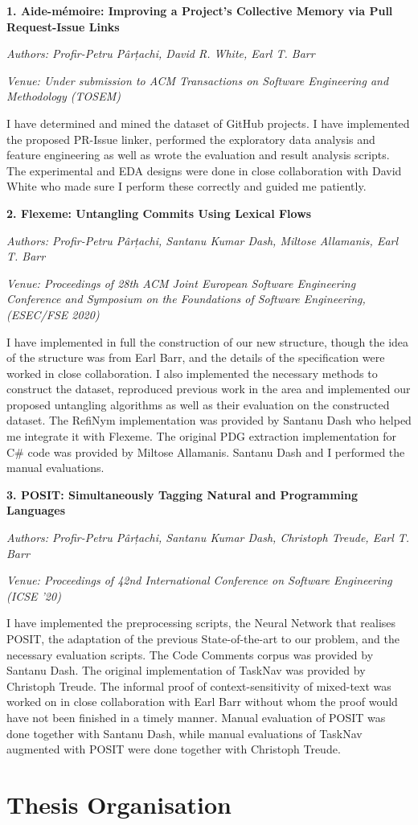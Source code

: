 \noindent\textbf{1. Aide-mémoire: Improving a Project’s Collective Memory via Pull
Request-Issue Links} 

\noindent\emph{Authors: Profir-Petru Pârțachi, David R. White, Earl T. Barr}

\noindent\emph{Venue: Under submission to ACM Transactions on Software
Engineering and Methodology (TOSEM)}

\noindent I have determined and mined the dataset of GitHub projects. I have
implemented the proposed PR-Issue linker, performed the exploratory data
analysis and feature engineering as well as wrote the evaluation and result
analysis scripts. The experimental and EDA designs were done in close
collaboration with David White who made sure I perform these correctly and
guided me patiently.

\noindent\textbf{2. Flexeme: Untangling Commits Using Lexical Flows}

\noindent\emph{Authors: Profir-Petru Pârțachi, Santanu Kumar Dash, Miltose
Allamanis, Earl T. Barr}

\noindent\emph{Venue: Proceedings of 28th ACM Joint European Software
Engineering Conference and Symposium on the Foundations of Software Engineering,
(ESEC/FSE 2020)}

\noindent  I have implemented in full the construction of our new structure,
though the idea of the structure was from Earl Barr, and the details of the
specification were worked in close collaboration. I also implemented the
necessary methods to construct the dataset, reproduced previous work in the area
and implemented our proposed untangling algorithms as well as their evaluation
on the constructed dataset. The RefiNym implementation was provided by Santanu
Dash who helped me integrate it with Flexeme. The original PDG extraction
implementation for C\# code was provided by Miltose Allamanis. Santanu Dash and
I performed the manual evaluations.

\noindent\textbf{3. POSIT: Simultaneously Tagging Natural and Programming
Languages} 

\noindent\emph{Authors: Profir-Petru Pârțachi, Santanu Kumar Dash, Christoph
Treude, Earl T. Barr}

\noindent\emph{Venue: Proceedings of 42nd International Conference on Software
Engineering (ICSE ’20)}

\noindent I have implemented the preprocessing scripts, the Neural Network that
realises POSIT, the adaptation of the previous State-of-the-art to our problem,
and the necessary evaluation scripts. The Code Comments corpus was provided by
Santanu Dash. The original implementation of TaskNav was provided by Christoph
Treude. The informal proof of context-sensitivity of mixed-text was worked on in
close collaboration with Earl Barr without whom the proof would have not been
finished in a timely manner. Manual evaluation of POSIT was done together with
Santanu Dash, while manual evaluations of TaskNav augmented with POSIT were done
together with Christoph Treude.

\section{Thesis Organisation}
\label{chapter:introduction:sec:organisation}

